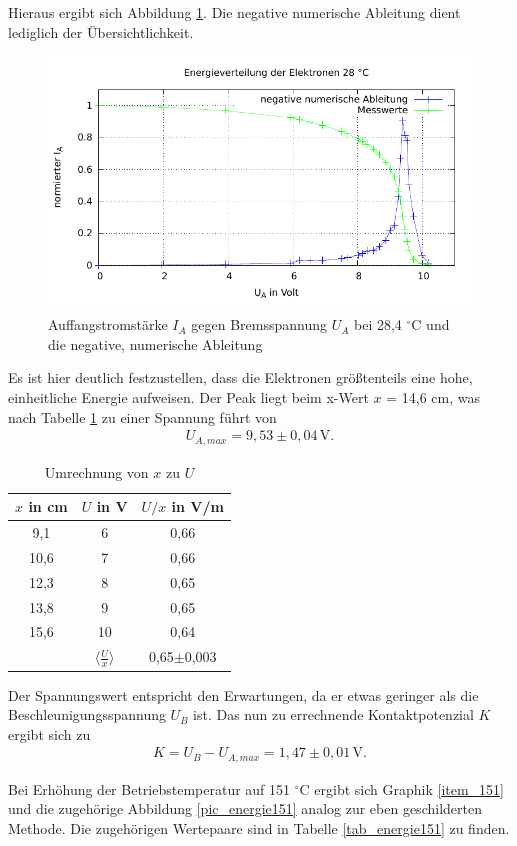 Hieraus ergibt sich Abbildung \ref{pic_energie28}. Die negative numerische Ableitung dient lediglich der Übersichtlichkeit.
\begin{figure}[H]
 \includegraphics[width=0.8 \textwidth]{pics/energie28.pdf}
 \caption{Auffangstromstärke $I_A$ gegen Bremsspannung $U_A$ bei 28,4 $^{\circ}$C und die negative, numerische Ableitung}
 \label{pic_energie28}
\end{figure}
Es ist hier deutlich festzustellen, dass die Elektronen größtenteils eine hohe, einheitliche Energie aufweisen. Der Peak liegt beim
x-Wert $x$ = 14,6 cm, was nach Tabelle \ref{tab_umrech28} zu einer Spannung führt von
\begin{align}
 U_{A,max} = 9,53 \pm 0,04 \, \text{V}.
\end{align}

\begin{table}[H]
 \begin{tabular}{c|c|c}
  $x$ in cm & $U$ in V & $U/x$ in V/m\\
  \hline
9,1 &	6&	0,66 \\
10,6&	7&	0,66\\
12,3&	8&	0,65\\
13,8&	9&	0,65\\
15,6&	10&	0,64\\
\hline
&	$\langle \frac{U}{x} \rangle$ &	0,65$\pm$0,003
 \end{tabular}
\caption{Umrechnung von $x$ zu $U$}
\label{tab_umrech28}
\end{table}
Der Spannungswert entspricht den Erwartungen, da er etwas geringer als die Beschleunigungsspannung $U_B$ ist. Das nun zu errechnende Kontaktpotenzial
$K$ ergibt sich zu
\begin{align}
 K = U_B - U_{A,max} = 1,47 \pm 0,01 \, \text{V}.
\end{align}

Bei Erhöhung der Betriebstemperatur auf 151 $^\circ$C ergibt sich Graphik \ref{item_151} und die zugehörige Abbildung \ref{pic_energie151}
analog zur eben geschilderten Methode. Die zugehörigen Wertepaare sind in Tabelle \ref{tab_energie151} zu finden.

